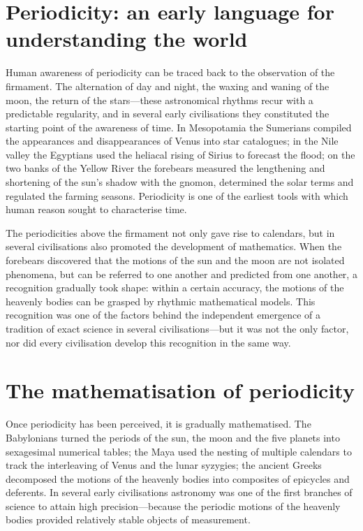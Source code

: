 \section*{Periodicity: an early language for understanding the world}

Human awareness of periodicity can be traced back to the observation of the firmament. The alternation of day and night, the waxing and waning of the moon, the return of the stars---these astronomical rhythms recur with a predictable regularity, and in several early civilisations they constituted the starting point of the awareness of time. In Mesopotamia the Sumerians compiled the appearances and disappearances of Venus into star catalogues; in the Nile valley the Egyptians used the heliacal rising of Sirius to forecast the flood; on the two banks of the Yellow River the forebears measured the lengthening and shortening of the sun's shadow with the gnomon, determined the solar terms and regulated the farming seasons. Periodicity is one of the earliest tools with which human reason sought to characterise time.

The periodicities above the firmament not only gave rise to calendars, but in several civilisations also promoted the development of mathematics. When the forebears discovered that the motions of the sun and the moon are not isolated phenomena, but can be referred to one another and predicted from one another, a recognition gradually took shape: within a certain accuracy, the motions of the heavenly bodies can be grasped by rhythmic mathematical models. This recognition was one of the factors behind the independent emergence of a tradition of exact science in several civilisations---but it was not the only factor, nor did every civilisation develop this recognition in the same way.

\section*{The mathematisation of periodicity}

Once periodicity has been perceived, it is gradually mathematised. The Babylonians turned the periods of the sun, the moon and the five planets into sexagesimal numerical tables; the Maya used the nesting of multiple calendars to track the interleaving of Venus and the lunar syzygies; the ancient Greeks decomposed the motions of the heavenly bodies into composites of epicycles and deferents. In several early civilisations astronomy was one of the first branches of science to attain high precision---because the periodic motions of the heavenly bodies provided relatively stable objects of measurement.

